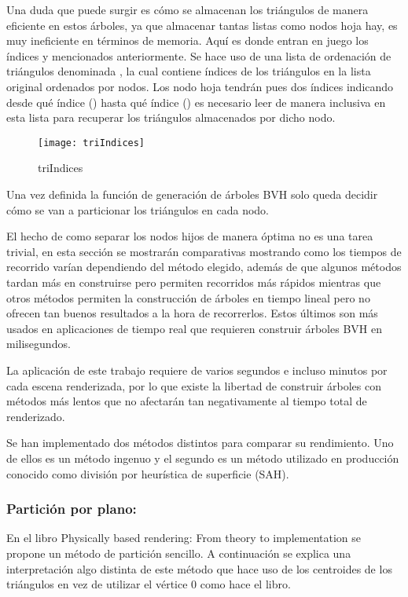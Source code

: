 Una duda que puede surgir es cómo se almacenan los triángulos de manera eficiente en estos árboles, ya que almacenar tantas listas como nodos hoja hay, es muy ineficiente en términos de memoria. Aquí es donde entran en juego los índices  y  mencionados anteriormente. Se hace uso de una lista de ordenación de triángulos denominada , la cual contiene índices de los triángulos en la lista original ordenados por nodos. Los nodo hoja tendrán pues dos índices indicando desde qué índice () hasta qué índice () es necesario leer de manera inclusiva en esta lista para recuperar los triángulos almacenados por dicho nodo.

\begin{figure}[H]
    \centering
	\texttt{[image: triIndices]}
	\caption{triIndices}
	\label{fig:label}
\end{figure}

Una vez definida la función de generación de árboles BVH solo queda decidir cómo se van a particionar los triángulos en cada nodo.

El hecho de como separar los nodos hijos de manera óptima no es una tarea trivial, en esta sección se mostrarán comparativas mostrando como los tiempos de recorrido varían dependiendo del método elegido, además de que algunos métodos tardan más en construirse pero permiten recorridos más rápidos mientras que otros métodos permiten la construcción de árboles en tiempo lineal pero no ofrecen tan buenos resultados a la hora de recorrerlos. Estos últimos son más usados en aplicaciones de tiempo real que requieren construir árboles BVH en milisegundos.

La aplicación de este trabajo requiere de varios segundos e incluso minutos por cada escena renderizada, por lo que existe la libertad de construir árboles con métodos más lentos que no afectarán tan negativamente al tiempo total de renderizado.

Se han implementado dos métodos distintos para comparar su rendimiento. Uno de ellos es un método ingenuo y el segundo es un método utilizado en producción conocido como división por heurística de superficie (SAH).

\subsubsection{Partición por plano:}

En el libro Physically based rendering: From theory to implementation \cite{pharr2016physically} se propone un método de partición sencillo. A continuación se explica una interpretación algo distinta de este método que hace uso de los centroides de los triángulos en vez de utilizar el vértice 0 como hace el libro.

